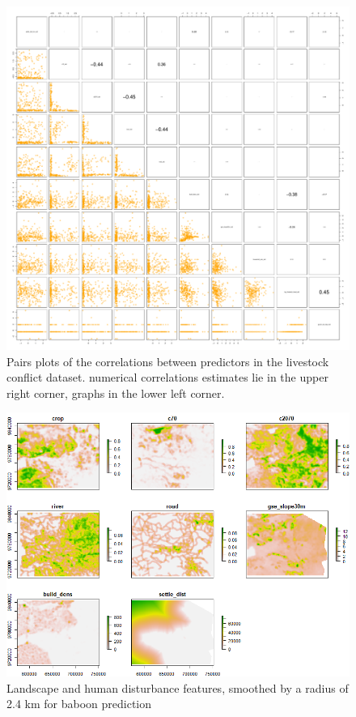 \documentclass[12pt,]{article}
\begin{document}
\begin{figure}
    \centering
    \includegraphics[width=\textwidth]{Figures/pairs_plot_livestock_preds.pdf}
    \caption{Pairs plots of the correlations between predictors in the livestock conflict dataset. numerical correlations estimates lie in the upper right corner, graphs in the lower left corner.}
    \label{fig:pairsplotlivestock}
\end{figure}


\begin{figure}[H]
    \centering
    \includegraphics[width=15cm]{Figures/baboon_predictorvar.png} %
    \caption{Landscape and human disturbance features, smoothed by a radius of 2.4 km for baboon prediction}
    \label{fig:bablandscapevar}
\end{figure}
\end{document}
